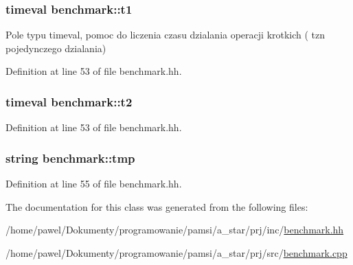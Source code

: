 \hypertarget{classbenchmark_a7789217b36df3b3ae427ceaaa2694d0b}{
\subsubsection[{t1}]{\setlength{\rightskip}{0pt plus 5cm}timeval benchmark\-::t1\hspace{0.3cm}{\ttfamily [private]}}}\label{classbenchmark_a7789217b36df3b3ae427ceaaa2694d0b}


Pole typu timeval, pomoc do liczenia czasu dzialania operacji krotkich ( tzn pojedynczego dzialania) 



Definition at line 53 of file benchmark.\-hh.

\hypertarget{classbenchmark_aea9f22e585c0c5826329e48a97a99803}{
\subsubsection[{t2}]{\setlength{\rightskip}{0pt plus 5cm}timeval benchmark\-::t2\hspace{0.3cm}{\ttfamily [private]}}}\label{classbenchmark_aea9f22e585c0c5826329e48a97a99803}


Definition at line 53 of file benchmark.\-hh.

\hypertarget{classbenchmark_a3d82cef61c145b6dc3c27d99aa93c20f}{
\subsubsection[{tmp}]{\setlength{\rightskip}{0pt plus 5cm}string benchmark\-::tmp\hspace{0.3cm}{\ttfamily [private]}}}\label{classbenchmark_a3d82cef61c145b6dc3c27d99aa93c20f}


Definition at line 55 of file benchmark.\-hh.



The documentation for this class was generated from the following files\-:\begin{DoxyCompactItemize}
\item 
/home/pawel/\-Dokumenty/programowanie/pamsi/a\-\_\-star/prj/inc/\hyperlink{benchmark_8hh}{benchmark.\-hh}\item 
/home/pawel/\-Dokumenty/programowanie/pamsi/a\-\_\-star/prj/src/\hyperlink{benchmark_8cpp}{benchmark.\-cpp}\end{DoxyCompactItemize}
